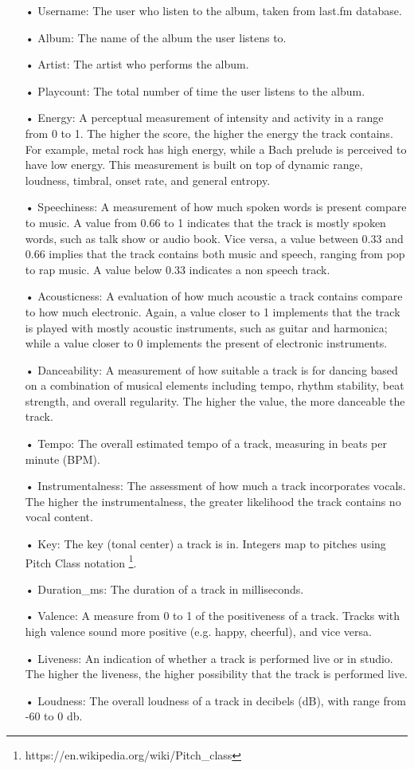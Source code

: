 \begin{itemize}
\item[•] Username: The user who listen to the album, taken from last.fm database.
\item[•] Album: The name of the album the user listens to.
\item[•] Artist: The artist who performs the album.
\item[•] Playcount: The total number of time the user listens to the album.
\item[•] Energy: A perceptual measurement of intensity and activity in a range from 0 to 1. The higher the score, the higher the energy the track contains. For example, metal rock has high energy, while a Bach prelude is perceived to have low energy. This measurement is built on top of dynamic range, loudness, timbral, onset rate, and general entropy.
\item[•] Speechiness: A measurement of how much spoken words is present compare to music. A value from 0.66 to 1 indicates that the track is mostly spoken words, such as talk show or audio book. Vice versa, a value between 0.33 and 0.66 implies that the track contains both music and speech, ranging from pop to rap music. A value below 0.33 indicates a non speech track. 
\item[•] Acousticness: A evaluation of how much acoustic a track contains compare to how much electronic. Again, a value closer to 1 implements that the track is played with mostly acoustic instruments, such as guitar and harmonica; while a value closer to 0 implements the present of electronic instruments.
\item[•] Danceability: A measurement of how suitable a track is for dancing based on a combination of musical elements including tempo, rhythm stability,  beat strength, and overall regularity. The higher the value, the more danceable the track.
\item[•] Tempo: The overall estimated tempo of a track, measuring in beats per minute (BPM).
\item[•] Instrumentalness: The assessment of how much a track incorporates vocals. The higher the instrumentalness, the greater likelihood the track contains no vocal content. 
\item[•] Key: The key (tonal center) a track is in. Integers map to pitches using Pitch Class notation \footnote{https://en.wikipedia.org/wiki/Pitch_class}. 
\item[•] Duration\_ms: The duration of a track in milliseconds.
\item[•] Valence: A measure from 0 to 1 of the positiveness of a track. Tracks with high valence sound more positive (e.g. happy, cheerful), and vice versa.
\item[•] Liveness: An indication of whether a track is performed live or in studio. The higher the liveness, the higher possibility that the track is performed live.
\item[•] Loudness: The overall loudness of a track in decibels (dB), with range from -60 to 0 db. 
\end{itemize}


